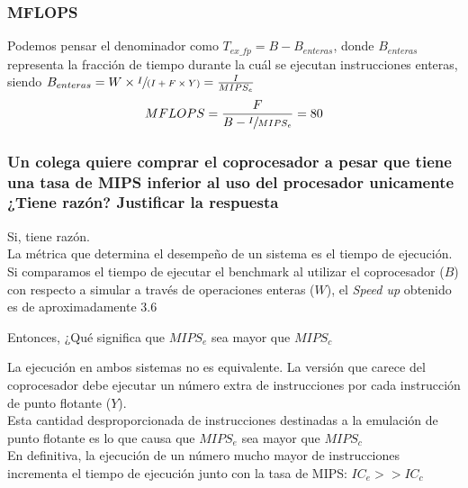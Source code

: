 \documentclass{beamer}
\begin{document}
\begin{frame}
\frametitle{MFLOPS}
Podemos pensar el denominador como $T_{ex\_fp} = B - B_{enteras}$, donde $B_{enteras}$ representa la fracción 
de tiempo durante la cuál se ejecutan instrucciones enteras, siendo $B_{enteras} = W \times \sfrac{I}{(I+F \times Y)} = \frac{I}{MIPS_e}$
%
\medskip
\begin{displaymath}
MFLOPS = \frac{F}{B - \sfrac{I}{MIPS_e}}  = 80
\end{displaymath}
\end{frame}

\begin{frame}
\frametitle{Un colega quiere comprar el coprocesador a pesar que tiene una tasa de MIPS inferior al uso del procesador
unicamente ¿Tiene razón? Justificar la respuesta}

Si, tiene razón.\\
\medskip
La métrica que determina el desempeño de un sistema es el tiempo de ejecución. Si comparamos el tiempo de ejecutar
el benchmark al utilizar el coprocesador ($B$) con respecto a simular a través de operaciones enteras ($W$), el 
\textit{Speed up} obtenido es de aproximadamente $3.6$

\bigskip
Entonces, ¿Qué significa que $MIPS_{e}$ sea mayor que $MIPS_{c}$
\end{frame}

\begin{frame}

La ejecución en ambos sistemas no es equivalente. La versión que carece del coprocesador debe ejecutar un número extra
de instrucciones por cada instrucción de punto flotante ($Y$).\\ 
\medskip
Esta cantidad desproporcionada de instrucciones destinadas a la emulación de punto flotante es lo que causa que 
$MIPS_{e}$ sea mayor que $MIPS_{c}$\\
\medskip
En definitiva, la ejecución de un número mucho mayor de instrucciones incrementa el tiempo de ejecución junto con
la tasa de MIPS: $IC_{e} >> IC_{c} $
\end{frame}
%
\end{document}
